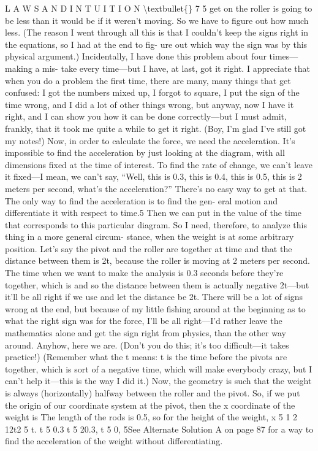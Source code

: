 \documentclass[10pt,oneside]{article}
\begin{document}
L A W S  A N D  I N T U I T I O N \textbackslash{}textbullet\{\} 7 5 get on the roller is going to be less than it would be if it weren’t moving. So we have to figure out how much less. (The reason I went through all this is that I couldn’t keep the signs right in the equations, so I had at the end to fig- ure out which way the sign was by this physical argument.) Incidentally, I have done this problem about four times---making a mis- take every time---but I have, at last, got it right. I appreciate that when you do a problem the first time, there are many, many things that get confused: I got the numbers mixed up, I forgot to square, I put the sign of the time wrong, and I did a lot of other things wrong, but anyway, now I have it right, and I can show you how it can be done correctly---but I must admit, frankly, that it took me quite a while to get it right. (Boy, I’m glad I’ve still got my notes!) Now, in order to calculate the force, we need the acceleration. It’s impossible to find the acceleration by just looking at the diagram, with all dimensions fixed at the time of interest. To find the rate of change, we can’t leave it fixed---I mean, we can’t say, “Well, this is 0.3, this is 0.4, this is 0.5, this is 2 meters per second, what’s the acceleration?” There’s no easy way to get at that. The only way to find the acceleration is to find the gen- eral motion and differentiate it with respect to time.5 Then we can put in the value of the time that corresponds to this particular diagram. So I need, therefore, to analyze this thing in a more general circum- stance, when the weight is at some arbitrary position. Let’s say the pivot and the roller are together at time and that the distance between them is 2t, because the roller is moving at 2 meters per second. The time when we want to make the analysis is 0.3 seconds before they’re together, which is and so the distance between them is actually negative 2t---but it’ll be all right if we use and let the distance be 2t. There will be a lot of signs wrong at the end, but because of my little fishing around at the beginning as to what the right sign was for the force, I’ll be all right---I’d rather leave the mathematics alone and get the sign right from physics, than the other way around. Anyhow, here we are. (Don’t you do this; it’s too difficult---it takes practice!) (Remember what the t means: t is the time before the pivots are together, which is sort of a negative time, which will make everybody crazy, but I can’t help it---this is the way I did it.) Now, the geometry is such that the weight is always (horizontally) halfway between the roller and the pivot. So, if we put the origin of our coordinate system at the pivot, then the x coordinate of the weight is The length of the rods is 0.5, so for the height of the weight, x 5 1 2 12t2 5 t. t 5 0.3 t 5 20.3, t 5 0, 5See Alternate Solution A on page 87 for a way to find the acceleration of the weight without differentiating.\par
\end{document}

